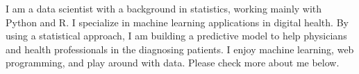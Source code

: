 %
%
%
\par{
I am a data scientist with a background in statistics, working mainly with Python and R. I specialize in machine learning applications in digital health. By using a statistical approach, I am building a predictive model to help physicians and health professionals in the diagnosing patients. I enjoy machine learning, web programming, and play around with data. Please check more about me below.
}